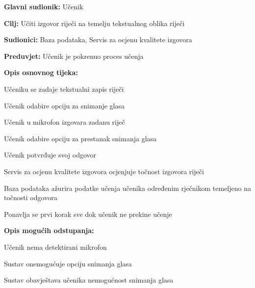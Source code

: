 					\noindent {}
					\begin{packed_item}
	
						\item \textbf{Glavni sudionik: }Učenik
						\item  \textbf{Cilj:} Učiti izgovor riječi na temelju tekstualnog oblika riječi
						\item  \textbf{Sudionici:} Baza podataka, Servis za ocjenu kvalitete izgovora
						\item  \textbf{Preduvjet:} Učenik je pokrenuo proces učenja
						\item  \textbf{Opis osnovnog tijeka:}
						
						\item[] \begin{packed_enum}
	
							\item Učeniku se zadaje tekstualni zapis riječi
							\item Učenik odabire opciju za snimanje glasa
							\item Učenik u mikrofon izgovara zadanu riječ
							\item Učenik odabire opciju za prestanak snimanja glasa
							\item Učenik potvrđuje svoj odgovor
							\item Servis za ocjenu kvalitete izgovora ocjenjuje točnost izgovora riječi
							\item Baza podataka ažurira podatke učenja učenika određenim rječnikom temeljeno na točnosti odgovora
							\item Ponavlja se prvi korak sve dok učenik ne prekine učenje
						\end{packed_enum}

						\item  \textbf{Opis mogućih odstupanja:}
						
						\item[] \begin{packed_item}
	
							\item[2.a] Učenik nema detektirani mikrofon
							\item[] \begin{packed_enum}
								
								\item Sustav onemogućuje opciju snimanja glasa
								\item Sustav obavještava učenika nemogućnost snimanja glasa
								
							\end{packed_enum}
						\end{packed_item}
						
					\end{packed_item}

